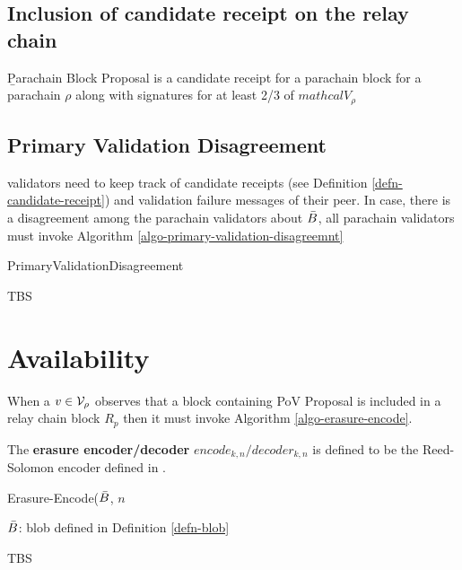 \subsection{Inclusion of candidate receipt on the relay chain}

\begin{definition}
  \label{defn-para-proposal}
        {\b Parachain Block Proposal} is a candidate receipt for a parachain block for a parachain $\rho$ along with signatures for at least 2/3 of $mathcal{V}_\rho$ 

\end{definition}

\subsection{Primary Validation Disagreement}
\label{sect-primary-validation-disagreemnt}
 validators need to keep track of candidate receipts (see Definition \ref{defn-candidate-receipt}) and validation failure messages of their peer. In case, there is a disagreement among the parachain validators about $\bar{B}$, all parachain validators must invoke Algorithm \ref{algo-primary-validation-disagreemnt}

\begin{algorithm}
  \caption[]{\sc PrimaryValidationDisagreement}
  \label{algo-primary-validation-disagreemnt}
  \begin{algorithmic}[1]
    \Require{}
    
    \State TBS
  \end{algorithmic}
\end{algorithm}

\section{Availability}

When a $v \in \mathcal{V}_\rho$ observes that a block containing PoV Proposal is included in a relay chain block $R_p$ then it must invoke Algorithm \ref{algo-erasure-encode}.

\begin{definition}
  \label{defn-erasure-encoder-decoder}
  The {\bf erasure encoder/decoder} {\bf $encode_{k,n}/decoder_{k,n}$ } is defined to be the Reed-Solomon encoder defined in \cite{??}. 
\end{definition}

\begin{algorithm}
  \caption[]{\sc Erasure-Encode($\bar{B}$, $n$}
  \label{algo-erasure-encode}
  \begin{algorithmic}[1]
  \Require
    $\bar{B}$: blob defined in Definition \ref{defn-blob}
  
    \State TBS
  \end{algorithmic}
\end{algorithm}

